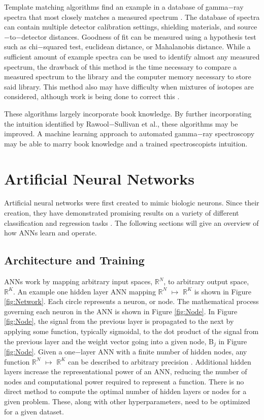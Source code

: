 \documentclass[tocnosub,noragright,centerchapter,12pt,fullpage]{uiucecethesis09}
\begin{document}
Template matching algorithms find an example in a database of gamma$-$ray spectra that most closely matches a measured spectrum \cite{burr2009}. The database of spectra can contain multiple detector calibration settings, shielding materials, and source$-$to$-$detector distances. Goodness of fit can be measured using a hypothesis test such as chi$-$squared test, euclidean distance, or Mahalanobis distance. While a sufficient amount of example spectra can be used to identify almost any measured spectrum, the drawback of this method is the time necessary to compare a measured spectrum to the library and the computer memory necessary to store said library. This method also may have difficulty when mixtures of isotopes are considered, although work is being done to correct this \cite{mattingly2010}.

These algorithms largely incorporate book knowledge. By further incorporating the intuition identified by Rawool$-$Sullivan et al., these algorithms may be improved. A machine learning approach to automated gamma$-$ray spectroscopy may be able to marry book knowledge and a trained spectroscopists intuition.  




\section{Artificial Neural Networks}

Artificial neural networks were first created to mimic biologic neurons. Since their creation, they have demonstrated promising results on a variety of different classification and regression tasks \cite{Jeyanthia2015, Krizhevsky2012, Rababaah2015}. The following sections will give an overview of how ANNs learn and operate.


\subsection{Architecture and Training}

ANNs work by mapping arbitrary input spaces, $\mathbb{R}^N$, to arbitrary output space, $\mathbb{R}^K$. An example one hidden layer ANN mapping $\mathbb{R}^N$ $\mapsto$ $\mathbb{R}^K$ is shown in Figure \ref{fig:Network}. Each circle represents a neuron, or node. The mathematical process governing each neuron in the ANN is shown in Figure \ref{fig:Node}. In Figure \ref{fig:Node}, the signal from the previous layer is propagated to the next by applying some function, typically sigmoidal, to the dot product of the signal from the previous layer and the weight vector going into a given node, B$_{j}$ in Figure \ref{fig:Node}. Given a one$-$layer ANN with a finite number of hidden nodes, any function $\mathbb{R}^N$ $\mapsto$ $\mathbb{R}^K$ can be described to arbitrary precision \cite{hornik1991}. Additional hidden layers increase the representational power of an ANN, reducing the number of nodes and computational power required to represent a function. There is no direct method to compute the optimal number of hidden layers or nodes for a given problem. These, along with other hyperparameters, need to be optimized for a given dataset.
\end{document}
